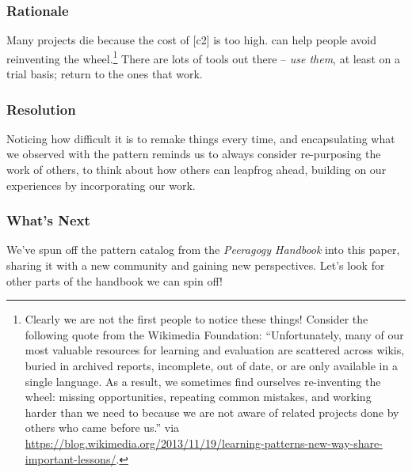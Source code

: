 \subsubsection*{Rationale} 
Many projects die because the cost of  [c2] is too high.   can help people avoid reinventing the wheel.\footnote{Clearly we are not the first people to notice these things!  Consider the following quote from the Wikimedia Foundation: ``Unfortunately, many of our most valuable resources for learning and evaluation are scattered across wikis, buried in archived reports, incomplete, out of date, or are only available in a single language. As a result, we sometimes find ourselves re-inventing the wheel: missing opportunities, repeating common mistakes, and working harder than we need to because we are not aware of related projects done by others who came before us.'' via \url{https://blog.wikimedia.org/2013/11/19/learning-patterns-new-way-share-important-lessons/}.}  There are lots of tools out there -- \emph{use them}, at least on a trial basis; return to the ones that work.

\subsubsection*{Resolution} Noticing how difficult it is to remake things every time, and encapsulating what we observed with the  pattern reminds us to always consider re-purposing the work of others, to think about how others can leapfrog ahead, building on our experiences by incorporating our work.

\subsubsection*{What's Next} We've spun off the pattern catalog from the \emph{Peeragogy Handbook} into this paper, sharing it with a new community and gaining new perspectives.  Let's look for other parts of the handbook we can spin off!


